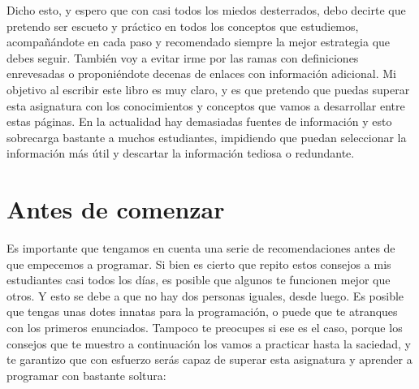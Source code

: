 Dicho esto, y espero que con casi todos los miedos desterrados, debo decirte que pretendo ser escueto y práctico en todos los 
conceptos que estudiemos, acompañándote en cada paso y recomendado siempre la mejor estrategia que debes seguir. También voy a evitar
irme por las ramas con definiciones enrevesadas o proponiéndote decenas de enlaces con información adicional. Mi objetivo al escribir
este libro es muy claro, y es que pretendo que puedas superar esta asignatura con los conocimientos y conceptos que vamos a desarrollar
entre estas páginas. En la actualidad hay demasiadas fuentes de información y esto sobrecarga bastante a muchos estudiantes, impidiendo 
que puedan seleccionar la información más útil y descartar la información tediosa o redundante. 

\section{Antes de comenzar}

Es importante que tengamos en cuenta una serie de recomendaciones antes de que empecemos a programar. Si bien es cierto que repito estos consejos
a mis estudiantes casi todos los días, es posible que algunos te funcionen mejor que otros. Y esto se debe a que no hay dos personas
iguales, desde luego. Es posible que tengas unas dotes innatas para la programación, o puede que te atranques con los primeros enunciados.
Tampoco te preocupes si ese es el caso, porque los consejos que te muestro a continuación los vamos a practicar hasta la saciedad, y
te garantizo que con esfuerzo serás capaz de superar esta asignatura y aprender a programar con bastante soltura:

